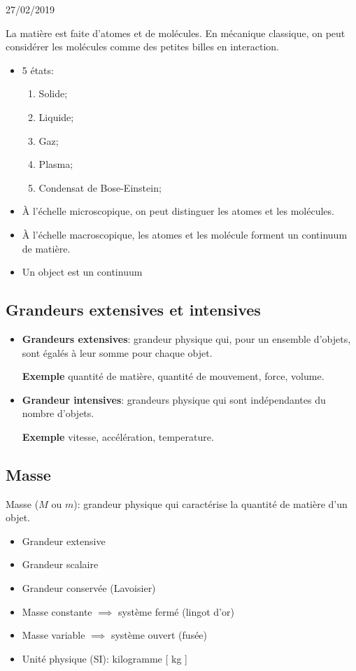 \documentclass[
    11pt,
    a4paper,
    oneside,
    headinlcude, footinclude,
    twoside,
]{report}
\newcommand{\markDate}[1]{\begin{flushright}#1\end{flushright}}
\begin{document}
\markDate{27/02/2019}

La matière est faite d'atomes et de molécules. En mécanique classique, on peut
considérer les molécules comme des petites billes en interaction.

\begin{itemize}
\item 5 états:
\begin{enumerate}
\item Solide;
\item Liquide;
\item Gaz;
\item Plasma;
\item Condensat de Bose-Einstein;
\end{enumerate}
\item À l'échelle microscopique, on peut distinguer les atomes et les
molécules.
\item À l'échelle macroscopique, les atomes et les molécule forment un
continuum de matière.
\item Un object est un continuum
\end{itemize}

\subsection{Grandeurs extensives et intensives}
\label{sub:grandeurs_extensives_et_intensives}

\begin{itemize}
\item \textbf{Grandeurs extensives}: grandeur physique qui, pour un
ensemble d'objets, sont égalés à leur somme pour chaque objet.

\textbf{Exemple} quantité de matière, quantité de mouvement, force,
volume.

\item \textbf{Grandeur intensives}: grandeurs physique qui sont
indépendantes du nombre d'objets.

\textbf{Exemple} vitesse, accélération, temperature.
\end{itemize}

\subsection{Masse}
\label{sub:masse}

Masse ($M$ ou $m$): grandeur physique qui caractérise la quantité de matière
d'un objet.
\begin{itemize}
\item Grandeur extensive
\item Grandeur scalaire
\item Grandeur conservée (Lavoisier)
\item Masse constante $\implies$ système fermé (lingot d'or)
\item Masse variable $\implies$ système ouvert (fusée)
\item Unité physique (SI): kilogramme [ kg ]
\end{itemize}
\end{document}
